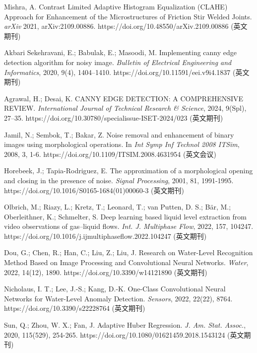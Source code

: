 {\begin{thebibliography}{99}
     Mishra, A. Contrast Limited Adaptive Histogram Equalization (CLAHE) Approach for Enhancement of the Microstructures of Friction Stir Welded Joints. \textit{arXiv} 2021, arXiv:2109.00886. https://doi.org/10.48550/arXiv.2109.00886	(英文期刊)

     Akbari Sekehravani, E.; Babulak, E.; Masoodi, M. Implementing canny edge detection algorithm for noisy image. \textit{Bulletin of Electrical Engineering and Informatics}, 2020, 9(4), 1404–1410. https://doi.org/10.11591/eei.v9i4.1837	(英文期刊)

     Agrawal, H.; Desai, K. CANNY EDGE DETECTION: A COMPREHENSIVE REVIEW. \textit{International Journal of Technical Research \& Science}, 2024, 9(Spl), 27–35. https://doi.org/10.30780/specialissue-ISET-2024/023	(英文期刊)

     Jamil, N.; Sembok, T.; Bakar, Z. Noise removal and enhancement of binary images using morphological operations. In \textit{Int Symp Inf Technol 2008 ITSim}, 2008, 3, 1-6. https://doi.org/10.1109/ITSIM.2008.4631954	(英文会议)

     Horebeek, J.; Tapia-Rodriguez, E. The approximation of a morphological opening and closing in the presence of noise. \textit{Signal Processing}, 2001, 81, 1991-1995. https://doi.org/10.1016/S0165-1684(01)00060-3	(英文期刊)

     Olbrich, M.; Riazy, L.; Kretz, T.; Leonard, T.; van Putten, D. S.; Bär, M.; Oberleithner, K.; Schmelter, S. Deep learning based liquid level extraction from video observations of gas–liquid flows. \textit{Int. J. Multiphase Flow}, 2022, 157, 104247. https://doi.org/10.1016/j.ijmultiphaseflow.2022.104247	(英文期刊)

     Dou, G.; Chen, R.; Han, C.; Liu, Z.; Liu, J. Research on Water-Level Recognition Method Based on Image Processing and Convolutional Neural Networks. \textit{Water}, 2022, 14(12), 1890. https://doi.org/10.3390/w14121890	(英文期刊)

     Nicholaus, I. T.; Lee, J.-S.; Kang, D.-K. One-Class Convolutional Neural Networks for Water-Level Anomaly Detection. \textit{Sensors}, 2022, 22(22), 8764. https://doi.org/10.3390/s22228764	(英文期刊)

     Sun, Q.; Zhou, W. X.; Fan, J. Adaptive Huber Regression. \textit{J. Am. Stat. Assoc.}, 2020, 115(529), 254-265. https://doi.org/10.1080/01621459.2018.1543124	(英文期刊)

\end{thebibliography}

}